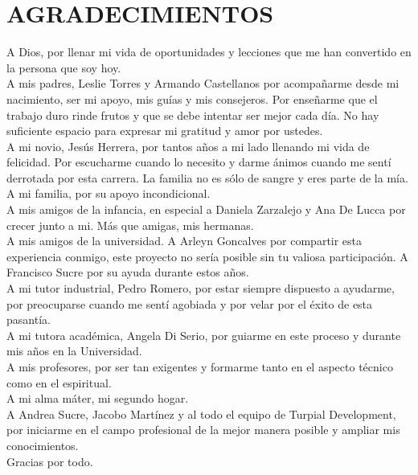 \chapter*{AGRADECIMIENTOS}

A Dios, por llenar mi vida de oportunidades y lecciones que me han convertido en la persona que soy hoy.\\

A mis padres, Leslie Torres y Armando Castellanos por acompañarme desde mi nacimiento, ser mi apoyo, mis guías y mis consejeros. Por enseñarme que el trabajo duro rinde frutos y que se debe intentar ser mejor cada día. No hay suficiente espacio para expresar mi gratitud y amor por ustedes.\\

A mi novio, Jesús Herrera, por tantos años a mi lado llenando mi vida de felicidad. Por escucharme cuando lo necesito y darme ánimos cuando me sentí derrotada por esta carrera. La familia no es sólo de sangre y eres parte de la mía.\\

A mi familia, por su apoyo incondicional.\\

A mis amigos de la infancia, en especial a Daniela Zarzalejo y Ana De Lucca por crecer junto a mi. Más que amigas, mis hermanas.\\

A mis amigos de la universidad. A Arleyn Goncalves por compartir esta experiencia conmigo, este proyecto no sería posible sin tu valiosa participación. A Francisco Sucre por su ayuda durante estos años.\\

A mi tutor industrial, Pedro Romero, por estar siempre dispuesto a ayudarme, por preocuparse cuando me sentí agobiada y por velar por el éxito de esta pasantía. \\

A mi tutora académica, Angela Di Serio, por guiarme en este proceso y durante mis años en la Universidad.\\

A mis profesores, por ser tan exigentes y formarme tanto en el aspecto técnico como en el espiritual.\\

A mi alma máter, mi segundo hogar.\\

A Andrea Sucre, Jacobo Martínez y al todo el equipo de Turpial Development, por iniciarme en el campo profesional de la mejor manera posible y ampliar mis conocimientos.\\

Gracias por todo.
